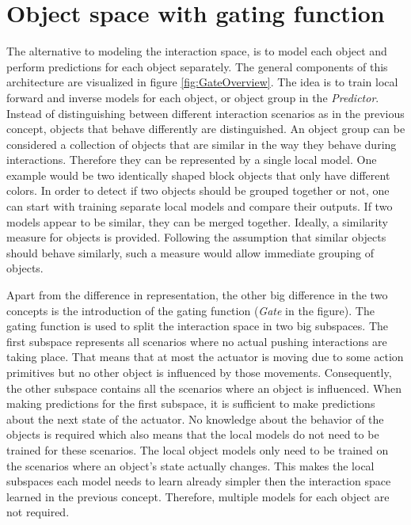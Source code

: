 
\section{Object space with gating function \label{sec:gate}}

The alternative to modeling the interaction space, is to model each object and perform predictions for each object separately. 
The general components of this architecture are visualized in figure \ref{fig:GateOverview}.
The idea is to train local forward and inverse models for each object, or object group in the \textit{Predictor}. 
Instead of distinguishing between different interaction scenarios as in the previous concept, objects that behave differently are distinguished. 
An object group can be considered a collection of objects that are similar in the way they behave during interactions. Therefore they can be represented by a single local model. One example would be two identically shaped block objects that only have different colors. In order to detect if two objects should be grouped together or not, one can start with training separate local models and compare their outputs. If two models appear to be similar, they can be merged together. Ideally, a similarity measure for objects is provided. Following the assumption that similar objects should behave similarly, such a measure would allow immediate grouping of objects.

Apart from the difference in representation, the other big difference in the two concepts is the introduction of the gating function (\textit{Gate} in the figure). The gating function is used to split the interaction space in two big subspaces. The first subspace represents all scenarios where no actual pushing interactions are taking place. That means that at most the actuator is moving due to some action primitives but no other object is influenced by those movements. Consequently, the other subspace contains all the scenarios where an object is influenced. When making predictions for the first subspace, it is sufficient to make predictions about the next state of the actuator. No knowledge about the behavior of the objects is required which also means that the local models do not need to be trained for these scenarios. The local object models only need to be trained on the scenarios where an object's state actually changes. 
This makes the local subspaces each model needs to learn already simpler then the interaction space learned in the previous concept. Therefore, multiple models for each object are not required.

